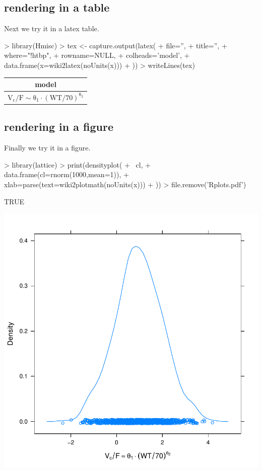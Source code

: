\documentclass[titlepage]{article}
\begin{document}
\subsection{rendering in a table}
Next we try it in a latex table.
\begin{Schunk}
\begin{Sinput}
> library(Hmisc)
> tex <- capture.output(latex(
+   file='',
+   title='',
+   where="!htbp",
+   rowname=NULL,
+   colheads='model',
+   data.frame(x=wiki2latex(noUnits(x)))
+ ))
> writeLines(tex)
\end{Sinput}
%
\begin{table}[!htbp]
 \begin{center}
 \begin{tabular}{l}\hline\hline
\multicolumn{1}{c}{model}\tabularnewline
\hline
$\mathrm{V_{c}/F  \sim\theta_{1}\cdot(WT/70)^{\theta_{2}}}$\tabularnewline
\hline
\end{tabular}

\end{center}

\end{table}\end{Schunk}
\subsection{rendering in a figure}
Finally we try it in a figure.
\begin{Schunk}
\begin{Sinput}
> library(lattice)
> print(densityplot(
+   ~cl,
+   data.frame(cl=rnorm(1000,mean=1)),
+   xlab=parse(text=wiki2plotmath(noUnits(x)))
+ ))
> file.remove('Rplots.pdf')
\end{Sinput}
\begin{Soutput}
[1] TRUE
\end{Soutput}
\end{Schunk}
\includegraphics{wikimath-figure}
\end{document}
